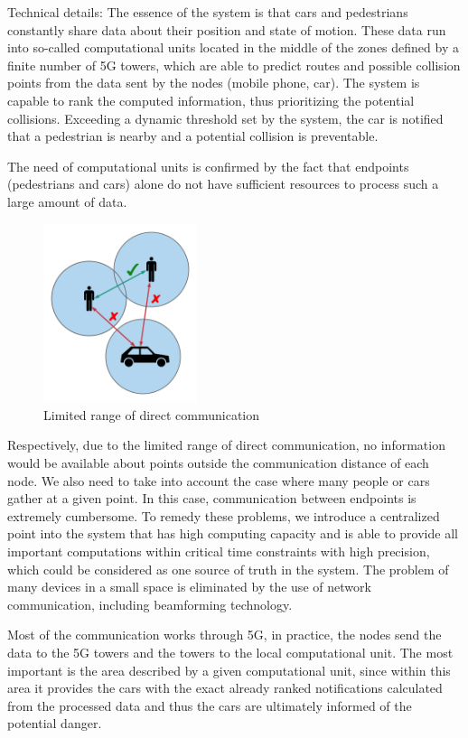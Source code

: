\documentclass[conference]{IEEEtran}
\begin{document}
Technical details: The essence of the system is that cars and pedestrians constantly share data about their position and state of motion. These data run into so-called computational units located in the middle of the zones defined by a finite number of 5G towers, which are able to predict routes and possible collision points from the data sent by the nodes (mobile phone, car). The system is capable to rank the computed information, thus prioritizing the potential collisions. Exceeding a dynamic threshold set by the system, the car is notified that a pedestrian is nearby and a potential collision is preventable.

The need of computational units is confirmed by the fact that endpoints (pedestrians and cars) alone do not have sufficient resources to process such a large amount of data.

\begin{figure}[h]
    \centering
    \includegraphics[width=4.5cm]{./pics/Range of direct communication.png}
    \caption{Limited range of direct communication}
\end{figure}

Respectively, due to the limited range of direct communication, no information would be available about points outside the communication distance of each node. We also need to take into account the case where many people or cars gather at a given point. In this case, communication between endpoints is extremely cumbersome. To remedy these problems, we introduce a centralized point into the system that has high computing capacity and is able to provide all important computations within critical time constraints with high precision, which could be considered as one source of truth in the system. The problem of many devices in a small space is eliminated by the use of network communication, including beamforming technology.

Most of the communication works through 5G, in practice, the nodes send the data to the 5G towers and the towers to the local computational unit. The most important is the area described by a given computational unit, since within this area it provides the cars with the exact already ranked notifications calculated from the processed data and thus the cars are ultimately informed of the potential danger.
\end{document}
